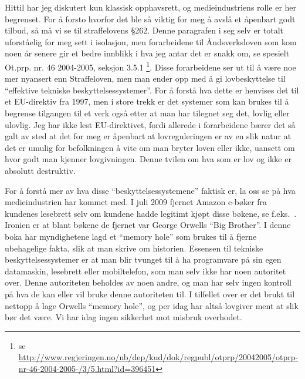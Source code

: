 \documentclass[11pt,norsk,a4paper]{article}
\begin{document}
Hittil har jeg diskutert kun klassisk opphavsrett, og medieindustriens
rolle er her begrenset. For å forsto hvorfor det ble så viktig for meg
å avslå et åpenbart godt tilbud, så må vi se til straffelovens
§262. Denne paragrafen i seg selv er totalt uforståelig for meg sett i
isolasjon, men forarbeidene til Åndsverksloven som kom noen år senere
gir et bedre innblikk i hva jeg antar det er snakk om, se spesielt
Ot.prp. nr. 46 2004-2005, seksjon 3.5.1 \footnote{se
  \url{http://www.regjeringen.no/nb/dep/kud/dok/regpubl/otprp/20042005/otprp-nr-46-2004-2005-/3/5.html?id=396451}}. 
Disse forarbeidene ser ut til å være noe mer nyansert enn
Straffeloven, men man ender opp med å gi lovbeskyttelse til
``effektive tekniske beskyttelsessystemer''. For å forstå hva dette er
henvises det til et EU-direktiv fra 1997, men i store trekk er det
systemer som kan brukes til å begrense tilgangen til et verk også
etter at man har tilegnet seg det, lovlig eller ulovlig. Jeg har ikke
lest EU-direktivet, fordi allerede i forarbeidene bærer det så galt av
sted at det for meg er åpenbart at lovreguleringen er av en slik natur
at det er umulig for befolkningen å vite om man bryter loven eller
ikke, uansett om hvor godt man kjenner lovgivningen. Denne tvilen om
hva som er lov og ikke er absolutt destruktiv. 

For å forstå mer av hva disse ``beskyttelsessystemene'' faktisk er, la
oss se på hva medieindustrien har kommet med.  I juli 2009 fjernet
Amazon e-bøker fra kundenes lesebrett selv om kundene hadde legitimt
kjøpt disse bøkene, se f.eks.~\cite{nytamazon}. Ironien er at blant
bøkene de fjernet var George Orwells ``Big Brother''. I denne boka har
myndighetene lagd et ``memory hole'' som brukes til å fjerne
ubehagelige fakta, slik at man skrive om historien. Essensen til
tekniske beskyttelsessystemer er at man blir tvunget til å ha
programvare på sin egen datamaskin, lesebrett eller mobiltelefon, som
man selv ikke har noen autoritet over. Denne autoriteten beholdes av
noen andre, og man har selv ingen kontroll på hva de kan eller vil
bruke denne autoriteten til. I tilfellet over er det brukt til nettopp
å lage Orwells ``memory hole'', og per idag har altså lovgiver ment at
slik bør det være. Vi har idag ingen sikkerhet mot misbruk overhodet.
\end{document}

